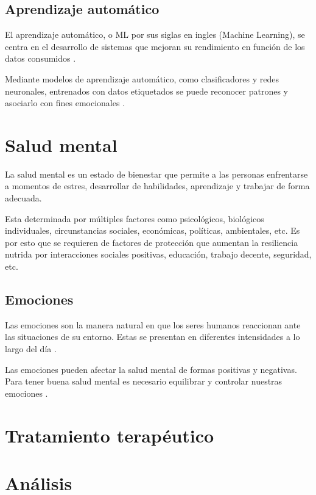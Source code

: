 \documentclass[12pt,twoside]{article}
\begin{document}
	\subsection{Aprendizaje automático}
	El aprendizaje automático, o ML por sus siglas en ingles (Machine Learning), se centra en el desarrollo de sistemas que mejoran su rendimiento en función de los datos consumidos \cite{info: ml}. 
	
	Mediante modelos de aprendizaje automático, como clasificadores y redes neuronales, entrenados con datos etiquetados se puede reconocer patrones y asociarlo con fines emocionales \cite{info: pln3}.
	
	\section{Salud mental}
	La salud mental es un estado de bienestar que permite a las personas enfrentarse a momentos de estres, desarrollar de habilidades, aprendizaje y trabajar de forma adecuada. 
	
	Esta determinada por múltiples factores como psicológicos, biológicos individuales, circunstancias sociales, económicas, políticas, ambientales, etc. Es por esto que se requieren de factores de protección que aumentan la resiliencia nutrida por interacciones sociales positivas, educación, trabajo decente, seguridad, etc. \cite{info: salud1}
	
	\subsection{Emociones}
	Las emociones son la manera natural en que los seres humanos reaccionan ante las situaciones de su entorno. Estas se presentan en diferentes intensidades a lo largo del día \cite{info: salud2}. 
	
	Las emociones pueden afectar la salud mental de formas positivas y negativas. Para tener buena salud mental es necesario equilibrar y controlar nuestras emociones \cite{info: salud3}. 
	
	\section{Tratamiento terapéutico}
	
	
	
	\clearpage
	\section{Análisis}
	
\end{document}
